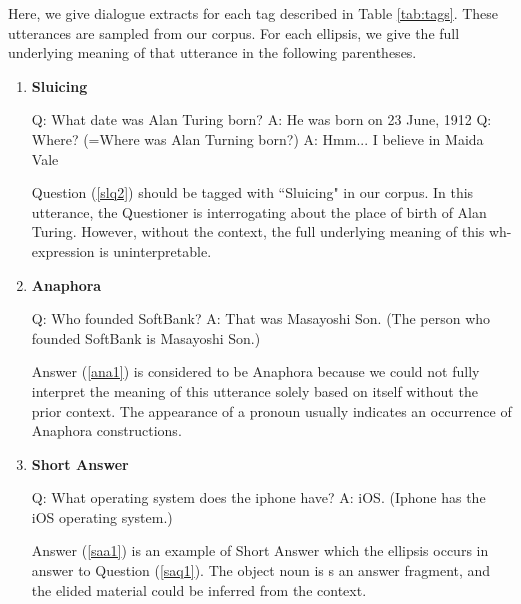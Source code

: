 \documentclass[bsc,frontabs,twoside,singlespacing,parskip,deptreport]{infthesis}     %
\begin{document}
Here, we give dialogue extracts for each tag described in Table \ref{tab:tags}. These utterances are sampled from our corpus. For each ellipsis, we give the full underlying meaning of that utterance in the following parentheses.

\begin{enumerate}
   \item \textbf{Sluicing}
   
\begin{exe}
	\ex
		\begin{xlist}
			\ex \label{slq1} Q: What date was Alan Turing born?
			\ex \label{sla1} A: He was born on 23 June, 1912
			\ex \label{slq2} Q: Where? (=Where was Alan Turning born?)
			\ex \label{sla2} A: Hmm... I believe in Maida Vale
\end{xlist}
\end{exe}

Question (\ref{slq2}) should be tagged with ``Sluicing" in our corpus. In this utterance, the Questioner is interrogating about the place of birth of Alan Turing. However, without the context, the full underlying meaning of this wh-expression is uninterpretable.

\item \textbf{Anaphora}

\begin{exe}
	\ex
		\begin{xlist}
			\ex \label{anq1} Q: Who founded SoftBank?
			\ex \label{ana1} A: That was Masayoshi Son. (The person who founded SoftBank is Masayoshi Son.)
\end{xlist}
\end{exe}

Answer (\ref{ana1}) is considered to be Anaphora because we could not fully interpret the meaning of this utterance solely based on itself without the prior context. The appearance of a pronoun usually indicates an occurrence of Anaphora constructions.

\item \textbf{Short Answer}

\begin{exe}
	\ex
		\begin{xlist}
			\ex \label{saq1} Q: What operating system does the iphone have?
			\ex \label{saa1} A: iOS. (Iphone has the iOS operating system.)
\end{xlist}
\end{exe}

Answer (\ref{saa1}) is an example of Short Answer which the ellipsis occurs in answer to Question (\ref{saq1}). The object noun is s an answer fragment, and the elided material could be inferred from the context.




\end{enumerate}
\end{document}
